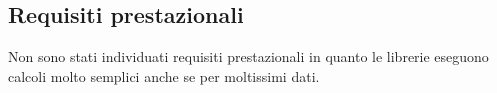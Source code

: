 \subsection{Requisiti prestazionali}
Non sono stati individuati requisiti prestazionali in quanto le librerie eseguono calcoli molto semplici anche se per moltissimi dati.